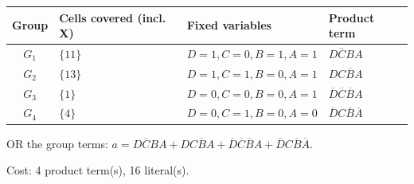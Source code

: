 \documentclass[a4paper,11pt]{article}
\begin{document}
\begin{minipage}{\textwidth}
\begin{center}\small
\begin{tabular}{clll}
\toprule
Group & Cells covered (incl. X) & Fixed variables & Product term\\\midrule
\textcolor{blue!75!black}{$G_{1}$} & $\{11\}$ & $D=1,C=0,B=1,A=1$ & $D\overline{C}BA$\\
\textcolor{red!75!black}{$G_{2}$} & $\{13\}$ & $D=1,C=1,B=0,A=1$ & $DC\overline{B}A$\\
\textcolor{teal!80!black}{$G_{3}$} & $\{1\}$ & $D=0,C=0,B=0,A=1$ & $\overline{D}\overline{C}\overline{B}A$\\
\textcolor{violet!85!black}{$G_{4}$} & $\{4\}$ & $D=0,C=1,B=0,A=0$ & $\overline{D}C\overline{B}\overline{A}$\\
\bottomrule\end{tabular}\end{center}


\noindent OR the group terms: $\boxed{a=D\overline{C}BA + DC\overline{B}A + \overline{D}\overline{C}\overline{B}A + \overline{D}C\overline{B}\overline{A}}$.

\noindent Cost: 4 product term(s), 16 literal(s).

\end{minipage}\par\vspace{0.25cm}
\end{document}
